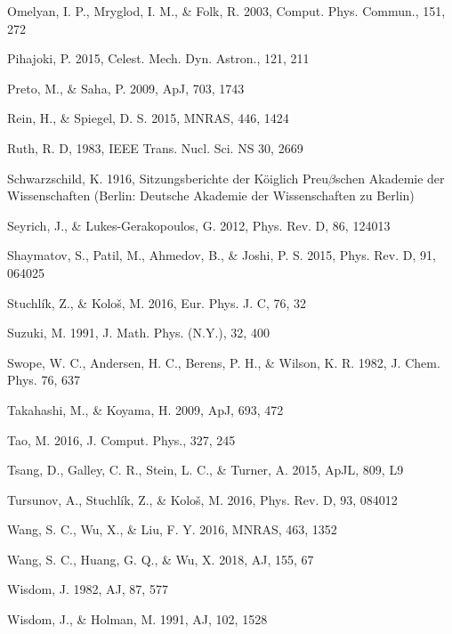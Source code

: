 \documentclass[preprint2]{aastex}
\begin{document}
\begin{thebibliography}{}
  Omelyan, I. P.,  Mryglod, I. M., \&  Folk, R. 2003, Comput. Phys.
Commun., 151, 272

 Pihajoki, P. 2015, Celest. Mech. Dyn. Astron., 121, 211

 Preto, M., \& Saha, P. 2009, ApJ, 703, 1743

 Rein, H., \& Spiegel, D. S. 2015, MNRAS, 446, 1424

 Ruth, R. D, 1983, IEEE Trans. Nucl. Sci. NS 30, 2669

 Schwarzschild, K. 1916, Sitzungsberichte der K\"{o}iglich
Preu$\beta$schen Akademie der Wissenschaften (Berlin: Deutsche
Akademie der Wissenschaften zu Berlin)

 Seyrich, J., \& Lukes-Gerakopoulos, G. 2012, Phys. Rev. D, 86, 124013

 Shaymatov, S., Patil, M., Ahmedov, B., \& Joshi, P. S. 2015, Phys. Rev.
D, 91, 064025

 Stuchl\'{i}k, Z., \& Kolo\v{s}, M. 2016, Eur. Phys. J. C, 76, 32

 Suzuki, M. 1991, J. Math. Phys. (N.Y.), 32, 400

  Swope, W. C.,  Andersen, H. C.,  Berens, P. H., \&  Wilson, K. R. 1982, J.
Chem. Phys. 76, 637

 Takahashi, M., \& Koyama, H. 2009, ApJ, 693, 472

 Tao, M. 2016, J. Comput. Phys., 327, 245

 Tsang, D.,  Galley, C. R.,  Stein, L. C., \& Turner, A. 2015, ApJL, 809, L9

 Tursunov, A., Stuchl\'{i}k, Z., \& Kolo\v{s}, M. 2016, Phys. Rev. D, 93, 084012

 Wang, S. C., Wu, X., \& Liu, F. Y. 2016, MNRAS, 463, 1352

 Wang, S. C., Huang, G. Q., \& Wu, X. 2018, AJ, 155, 67

 Wisdom, J. 1982, AJ, 87, 577

 Wisdom, J., \& Holman, M. 1991, AJ, 102, 1528


\end{thebibliography}
\end{document}
